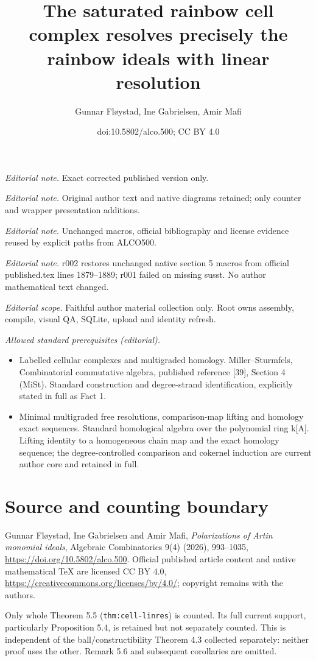 \documentclass[10pt,a4paper]{article}
\title{The saturated rainbow cell complex resolves precisely the rainbow ideals with linear resolution}
\author{Gunnar Fløystad, Ine Gabrielsen, Amir Mafi}
\date{doi:10.5802/alco.500; CC BY 4.0}
\theoremstyle{definition}
\theoremstyle{remark}
\theoremstyle{plain}
\begin{document}
\maketitle
\noindent\textit{Editorial note.} Exact corrected published version only.\par\medskip
\noindent\textit{Editorial note.} Original author text and native diagrams retained; only counter and wrapper presentation additions.\par\medskip
\noindent\textit{Editorial note.} Unchanged macros, official bibliography and license evidence reused by explicit paths from ALCO500.\par\medskip
\noindent\textit{Editorial note.} r002 restores unchanged native section 5 macros from official published.tex lines 1879–1889; r001 failed on missing susst. No author mathematical text changed.\par\medskip
\noindent\textit{Editorial scope.} Faithful author material collection only. Root owns assembly, compile, visual QA, SQLite, upload and identity refresh.\par\medskip
\noindent\textit{Allowed standard prerequisites (editorial).}\begin{itemize}
\item Labelled cellular complexes and multigraded homology. Miller–Sturmfels, Combinatorial commutative algebra, published reference [39], Section 4 (MiSt). Standard construction and degree-strand identification, explicitly stated in full as Fact 1.
\item Minimal multigraded free resolutions, comparison-map lifting and homology exact sequences. Standard homological algebra over the polynomial ring k[A]. Lifting identity to a homogeneous chain map and the exact homology sequence; the degree-controlled comparison and cokernel induction are current author core and retained in full.
\end{itemize}\medskip
\section*{Source and counting boundary}
Gunnar Fløystad, Ine Gabrielsen and Amir Mafi, \emph{Polarizations of Artin monomial ideals}, Algebraic Combinatorics 9(4) (2026), 993--1035, \url{https://doi.org/10.5802/alco.500}. Official published article content and native mathematical TeX are licensed CC BY 4.0, \url{https://creativecommons.org/licenses/by/4.0/}; copyright remains with the authors.

Only whole Theorem 5.5 (\texttt{thm:cell-linres}) is counted. Its full current support, particularly Proposition 5.4, is retained but not separately counted. This is independent of the ball/constructibility Theorem 4.3 collected separately: neither proof uses the other. Remark 5.6 and subsequent corollaries are omitted.
\end{document}
